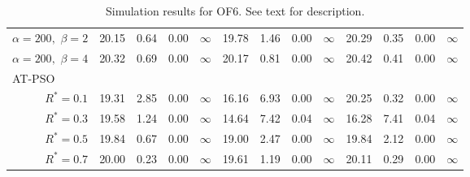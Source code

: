 \documentclass[12pt]{article}
\begin{document}
\begin{table}[ht]
{\begin{tabular}{r|rrrr|rrrr|rrrr}
  $\alpha = 200,$ $\beta =2$ & 20.15 & 0.64 & 0.00 & $\infty$ & 19.78 & 1.46 & 0.00 & $\infty$ & 20.29 & 0.35 & 0.00 & $\infty$ \\ 
  $\alpha = 200,$ $\beta =4$ & 20.32 & 0.69 & 0.00 & $\infty$ & 20.17 & 0.81 & 0.00 & $\infty$ & 20.42 & 0.41 & 0.00 & $\infty$ \\ 
\hline
\multicolumn{1}{l|}{AT-PSO} &&&&&&&&&&&&\\
  $R^* = 0.1$ & 19.31 & 2.85 & 0.00 & $\infty$ & 16.16 & 6.93 & 0.00 & $\infty$ & 20.25 & 0.32 & 0.00 & $\infty$ \\ 
  $R^* = 0.3$ & 19.58 & 1.24 & 0.00 & $\infty$ & 14.64 & 7.42 & 0.04 & $\infty$ & 16.28 & 7.41 & 0.04 & $\infty$ \\ 
  $R^* = 0.5$ & 19.84 & 0.67 & 0.00 & $\infty$ & 19.00 & 2.47 & 0.00 & $\infty$ & 19.84 & 2.12 & 0.00 & $\infty$ \\ 
  $R^* = 0.7$ & 20.00 & 0.23 & 0.00 & $\infty$ & 19.61 & 1.19 & 0.00 & $\infty$ & 20.11 & 0.29 & 0.00 & $\infty$ \\ 
   \hline
\end{tabular}
}
\caption{Simulation results for OF6. See text for description.}
\label{tab:psosim6}
\end{table}
\end{document}
